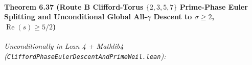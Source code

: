 \documentclass[
  11pt,
]{article}
\begin{document}
\paragraph{\texorpdfstring{Theorem 6.37 (Route B Clifford-Torus
\(\{2, 3, 5, 7\}\) Prime-Phase Euler Splitting and Unconditional Global
All-\(\gamma\) Descent to \(\sigma \ge 2\),
\(\operatorname{Re}(s) \ge 5/2\))}{Theorem 6.37 (Route B Clifford-Torus \textbackslash\{2, 3, 5, 7\textbackslash\} Prime-Phase Euler Splitting and Unconditional Global All-\textbackslash gamma Descent to \textbackslash sigma \textbackslash ge 2, \textbackslash operatorname\{Re\}(s) \textbackslash ge 5/2)}}\label{theorem-6.37-route-b-clifford-torus-2-3-5-7-prime-phase-euler-splitting-and-unconditional-global-all-gamma-descent-to-sigma-ge-2-operatornameres-ge-52}

\emph{Unconditionally in Lean 4 + Mathlib4
(\texttt{CliffordPhaseEulerDescentAndPrimeWeil.lean}):}
\end{document}
